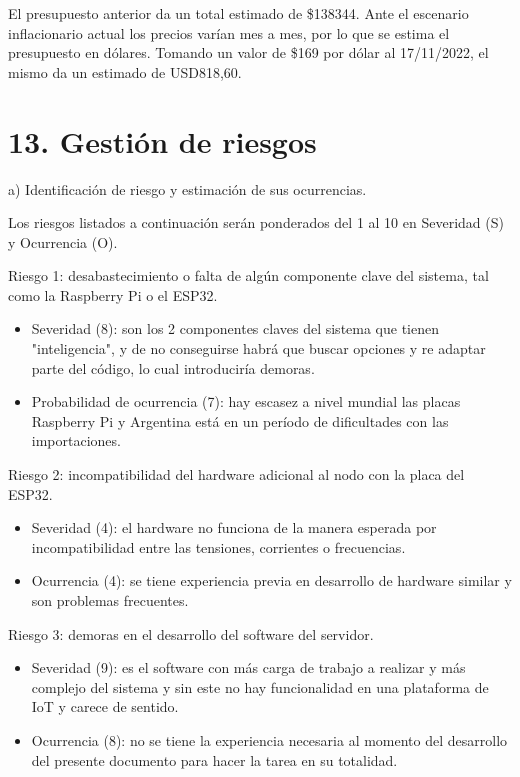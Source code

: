 \documentclass[
11pt, %
]{charter}
\begin{document}
El presupuesto anterior da un total estimado de \$138344. Ante el escenario inflacionario actual los precios varían mes a mes, por lo que se estima el presupuesto en dólares. Tomando un valor de \$169 por dólar al 17/11/2022, el mismo da un estimado de USD818,60.

\section{13. Gestión de riesgos}
\label{sec:riesgos}

a) Identificación de riesgo y estimación de sus ocurrencias.

Los riesgos listados a continuación serán ponderados del 1 al 10 en Severidad (S) y Ocurrencia (O).
 
Riesgo 1: desabastecimiento o falta de algún componente clave del sistema, tal como la Raspberry Pi o el ESP32.
\begin{itemize}
	\item Severidad (8): son los 2 componentes claves del sistema que tienen "inteligencia", y de no conseguirse habrá que buscar opciones y re adaptar parte del código, lo cual introduciría demoras.
	\item Probabilidad de ocurrencia (7): hay escasez a nivel mundial las placas Raspberry Pi y Argentina está en un período de dificultades con las importaciones.\\ 
\end{itemize}   

Riesgo 2: incompatibilidad del hardware adicional al nodo con la placa del ESP32.
\begin{itemize}
	\item Severidad (4): el hardware no funciona de la manera esperada por incompatibilidad entre las tensiones, corrientes o frecuencias.
	\item Ocurrencia (4): se tiene experiencia previa en desarrollo de hardware similar y son problemas frecuentes.
\end{itemize}

Riesgo 3: demoras en el desarrollo del software del servidor.
\begin{itemize}
	\item Severidad (9): es el software con más carga de trabajo a realizar y más complejo del sistema y sin este no hay funcionalidad en una plataforma de IoT y carece de sentido.
	\item Ocurrencia (8): no se tiene la experiencia necesaria al momento del desarrollo del presente documento para hacer la tarea en su totalidad.
\end{itemize}
\end{document}
